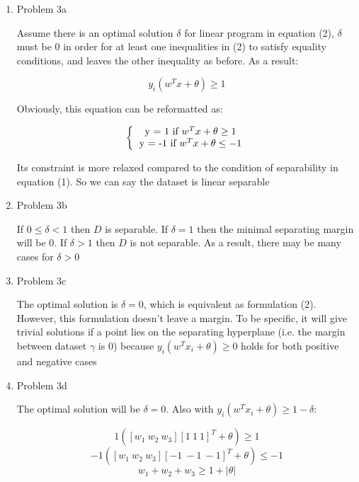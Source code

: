 \documentclass[11pt]{article}
\newcommand{\solution}[1]{{{\color{black}{\bf Solution:} {#1}}}}
\begin{document}
\begin{enumerate}
\item Problem 3a

\solution{Assume there is an optimal solution $\delta$ for linear program in equation (2), $\delta$ must be 0 in order for at least one inequalities in (2) to satisfy equality conditions, and leaves the other inequality as before. As a result:

$$ y_i(w^Tx + \theta) \geq 1 $$

Obviously, this equation can be reformatted as: 

\[ 
\bigg \{
  \begin{tabular}{ccc}
  y = 1 if $w^Tx + \theta \geq 1$\\
  y = -1 if $w^Tx + \theta \leq -1$\\
  \end{tabular}
\] 

Its constraint is more relaxed compared to the condition of separability in equation (1). So we can say the dataset is linear separable

}

\vspace{2cm}
\item Problem 3b

\solution{If $0 \leq \delta < 1$ then $D$ is separable. If $\delta = 1$ then the minimal separating margin will be 0. If $\delta > 1$ then $D$ is not separable. As a result, there may be many cases for $\delta > 0$}

\vspace{2cm}
\item Problem 3c

\solution{The optimal solution is $\delta = 0$, which is equivalent as formulation (2). However, this formulation doesn't leave a margin. To be specific, it will give trivial solutions if a point lies on the separating hyperplane (i.e. the margin between dataset $\gamma$ is 0) because $y_i(w^Tx_i + \theta)\geq 0$ holds for both positive and negative cases}

\vspace{2cm}
\item Problem 3d

\solution{The optimal solution will be $\delta = 0$. Also with $ y_i(w^Tx_i + \theta) \geq 1-\delta $:

$$ 1([w_1 \ w_2 \ w_3][1 \ 1 \ 1]^T + \theta) \geq 1 $$
$$ -1([w_1 \ w_2 \ w_3][-1 \ -1 \ -1]^T + \theta) \leq -1 $$
$$ w_1 + w_2 + w_3  \geq 1 +  | \theta | $$
}


\end{enumerate}
\end{document}
